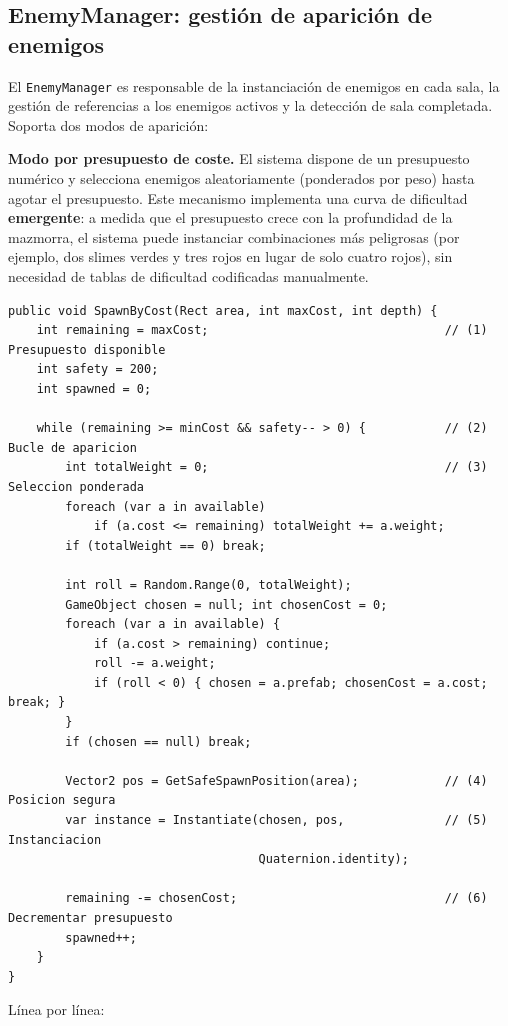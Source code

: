 \subsection{EnemyManager: gestión de aparición de enemigos}


El \texttt{EnemyManager} es responsable de la instanciación de enemigos en cada sala, la gestión de referencias a los enemigos activos y la detección de sala completada. Soporta dos modos de aparición:

\textbf{Modo por presupuesto de coste.} El sistema dispone de un presupuesto numérico y selecciona enemigos aleatoriamente (ponderados por peso) hasta agotar el presupuesto. Este mecanismo implementa una curva de dificultad \textbf{emergente}: a medida que el presupuesto crece con la profundidad de la mazmorra, el sistema puede instanciar combinaciones más peligrosas (por ejemplo, dos slimes verdes y tres rojos en lugar de solo cuatro rojos), sin necesidad de tablas de dificultad codificadas manualmente.

\begin{lstlisting}
public void SpawnByCost(Rect area, int maxCost, int depth) {
    int remaining = maxCost;                                 // (1) Presupuesto disponible
    int safety = 200;
    int spawned = 0;
    
    while (remaining >= minCost && safety-- > 0) {           // (2) Bucle de aparicion
        int totalWeight = 0;                                 // (3) Seleccion ponderada
        foreach (var a in available)
            if (a.cost <= remaining) totalWeight += a.weight;
        if (totalWeight == 0) break;
        
        int roll = Random.Range(0, totalWeight);
        GameObject chosen = null; int chosenCost = 0;
        foreach (var a in available) {
            if (a.cost > remaining) continue;
            roll -= a.weight;
            if (roll < 0) { chosen = a.prefab; chosenCost = a.cost; break; }
        }
        if (chosen == null) break;
        
        Vector2 pos = GetSafeSpawnPosition(area);            // (4) Posicion segura
        var instance = Instantiate(chosen, pos,              // (5) Instanciacion
                                   Quaternion.identity);
        
        remaining -= chosenCost;                             // (6) Decrementar presupuesto
        spawned++;
    }
}
\end{lstlisting}


Línea por línea:

